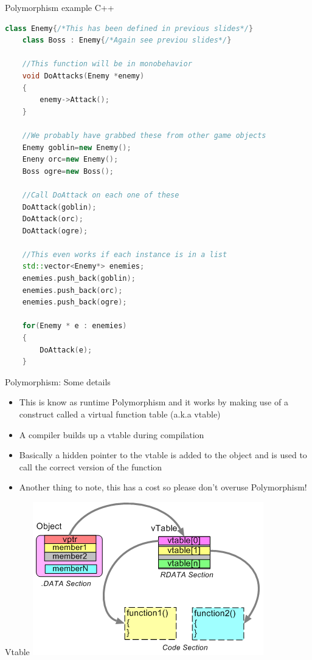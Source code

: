 \begin{frame}[fragile]{Polymorphism example C++}
	\begin{lstlisting}[language=C++,basicstyle=\tiny,]
	class Enemy{/*This has been defined in previous slides*/}
	class Boss : Enemy{/*Again see previou slides*/}
	
	//This function will be in monobehavior
	void DoAttacks(Enemy *enemy)
	{
		enemy->Attack();
	}
	
	//We probably have grabbed these from other game objects
	Enemy goblin=new Enemy();
	Eneny orc=new Enemy();
	Boss ogre=new Boss();
	
	//Call DoAttack on each one of these
	DoAttack(goblin);
	DoAttack(orc);
	DoAttack(ogre);
	
	//This even works if each instance is in a list
	std::vector<Enemy*> enemies;
	enemies.push_back(goblin);
	enemies.push_back(orc);
	enemies.push_back(ogre);
	
	for(Enemy * e : enemies)
	{
		DoAttack(e);
	}
	\end{lstlisting}
\end{frame}

\begin{frame}{Polymorphism: Some details}
	\begin{itemize}
		\pause \item This is know as runtime Polymorphism and it works by making use of a construct called a virtual function table (a.k.a vtable)
		\pause \item A compiler builds up a vtable during compilation
		\pause \item Basically a hidden pointer to the vtable is added to the object and is used to call the correct version of the function
		\pause \item Another thing to note, this has a cost so please don't overuse Polymorphism!  
	\end{itemize}
\end{frame}

\begin{frame}{Vtable}
	\includegraphics{vtable}
\end{frame}

